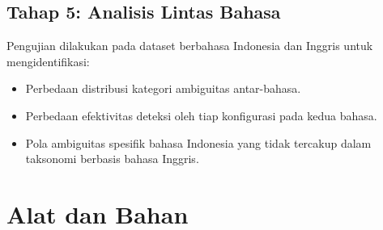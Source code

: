 \subsection{Tahap 5: Analisis Lintas Bahasa}

Pengujian dilakukan pada dataset berbahasa Indonesia dan Inggris untuk mengidentifikasi:
\begin{itemize}
	\item Perbedaan distribusi kategori ambiguitas antar-bahasa.
	\item Perbedaan efektivitas deteksi oleh tiap konfigurasi pada kedua bahasa.
	\item Pola ambiguitas spesifik bahasa Indonesia yang tidak tercakup dalam taksonomi berbasis bahasa Inggris.
\end{itemize}

\section{Alat dan Bahan}
%
